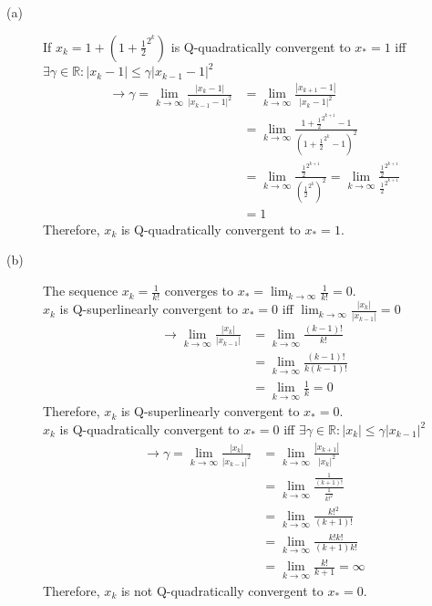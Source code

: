 \documentclass[11pt]{article}
\begin{document}
\begin{description}
\begin{description}
    \item[(a)]
    If $x_k=1+(1+\frac{1}{2}^{2^k})$ is Q-quadratically convergent to $x_*=1$
    iff $\exists\gamma\in\mathbb{R}: |x_k-1| \leq \gamma|x_{k-1}-1|^2$
    \begin{equation*}
        \begin{aligned}
            \rightarrow \gamma = \lim_{k\rightarrow\infty} \frac{|x_k-1|}{|x_{k-1}-1|^2}
            &= \lim_{k\rightarrow\infty} \frac{|x_{k+1}-1|}{|x_k-1|^2}
            \\ &= \lim_{k\rightarrow\infty} \frac{1+\frac{1}{2}^{2^{k+1}}-1}{(1+\frac{1}{2}^{2^k}-1)^2}
            \\ &= \lim_{k\rightarrow\infty} \frac{\frac{1}{2}^{2^{k+1}}}{(\frac{1}{2}^{2^k})^2} = \lim_{k\rightarrow\infty} \frac{\frac{1}{2}^{2^{k+1}}}{\frac{1}{2}^{2^{k+1}}}
            \\ &= 1
        \end{aligned}
    \end{equation*}
    Therefore, $x_k$ is Q-quadratically convergent to $x_*=1$.

    \item[(b)]
    The sequence $x_k=\frac{1}{k!}$ converges to $x_*=\lim_{k\rightarrow\infty}\frac{1}{k!}=0$. \\
    $x_k$ is Q-superlinearly convergent to $x_*=0$
    iff $\lim_{k\rightarrow\infty}\frac{|x_k|}{|x_{k-1}|}=0$
    \begin{equation*}
        \begin{aligned}
            \rightarrow \lim_{k\rightarrow\infty}\frac{|x_k|}{|x_{k-1}|}
            &= \lim_{k\rightarrow\infty}\frac{(k-1)!}{k!} \\
            &= \lim_{k\rightarrow\infty}\frac{(k-1)!}{k(k-1)!} \\
            &= \lim_{k\rightarrow\infty}\frac{1}{k} = 0
        \end{aligned}
    \end{equation*}
    Therefore, $x_k$ is Q-superlinearly convergent to $x_*=0$. \\
    $x_k$ is Q-quadratically convergent to $x_*=0$
    iff $\exists\gamma\in\mathbb{R}: |x_k| \leq \gamma|x_{k-1}|^2$
    \begin{equation*}
        \begin{aligned}
            \rightarrow \gamma = \lim_{k\rightarrow\infty} \frac{|x_k|}{|x_{k-1}|^2}
            &= \lim_{k\rightarrow\infty} \frac{|x_{k+1}|}{|x_k|^2} \\
            &= \lim_{k\rightarrow\infty} \frac{\frac{1}{(k+1)!}}{\frac{1}{k!^2}} \\
            &= \lim_{k\rightarrow\infty} \frac{k!^2}{(k+1)!} \\
            &= \lim_{k\rightarrow\infty} \frac{k!k!}{(k+1)k!} \\
            &= \lim_{k\rightarrow\infty} \frac{k!}{k+1} = \infty
        \end{aligned}
    \end{equation*}
    Therefore, $x_k$ is not Q-quadratically convergent to $x_*=0$. \\


\end{description}
\end{description}
\end{document}

